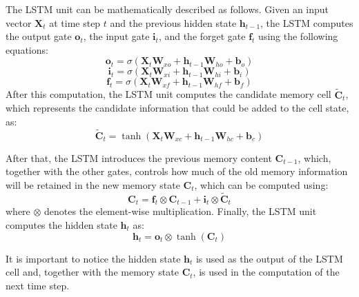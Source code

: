 The LSTM unit can be mathematically described as follows. Given an input vector $\boldsymbol{X}_t$ at time step $t$ and the previous hidden state $\boldsymbol{h}_{t-1}$, the LSTM computes the output gate $\boldsymbol{o}_t$, the input gate $\boldsymbol{i}_t$, and the forget gate $\boldsymbol{f}_t$ using the following equations:
\begin{equation}
    \boldsymbol{o}_t = \sigma\left(\boldsymbol{X}_t \boldsymbol{W}_{xo} + \boldsymbol{h}_{t-1}\boldsymbol{W}_{ho} + \boldsymbol{b}_o\right)
    \label{eq-LSTM-Ot}
\end{equation}
\begin{equation}
    \boldsymbol{i}_t = \sigma\left(\boldsymbol{X}_t \boldsymbol{W}_{xi} + \boldsymbol{h}_{t-1}\boldsymbol{W}_{hi} + \boldsymbol{b}_i\right)
    \label{eq-LSTM-It}
\end{equation}
\begin{equation}
    \boldsymbol{f}_t = \sigma\left(\boldsymbol{X}_t \boldsymbol{W}_{xf} + \boldsymbol{h}_{t-1}\boldsymbol{W}_{hf} + \boldsymbol{b}_f\right)
    \label{eq-LSTM-Ft}
\end{equation}
After this computation, the LSTM unit computes the candidate memory cell $\boldsymbol{\tilde{C}}_t$, which represents the candidate information that could be added to the cell state, as:
\begin{equation}
    \boldsymbol{\tilde{C}}_t = \tanh \left(\boldsymbol{X}_t \boldsymbol{W}_{xc} + \boldsymbol{h}_{t-1}\boldsymbol{W}_{hc} + \boldsymbol{b}_c\right)
    \label{eq-CNN-Candidate}
\end{equation}

After that, the LSTM introduces the previous memory content $\boldsymbol{C}_{t-1}$, which, together with the other gates, controls how much of the old memory information will be retained in the new memory state $\boldsymbol{C}_{t}$, which can be computed using: 
\begin{equation}
    \boldsymbol{C}_t = \boldsymbol{f}_t \otimes \boldsymbol{C}_{t-1} + \boldsymbol{i}_t \otimes \boldsymbol{\tilde{C}}_t
\end{equation}
where $\otimes$ denotes the element-wise multiplication. Finally, the LSTM unit computes the hidden state $\boldsymbol{h}_t$ as:
\begin{equation}
    \boldsymbol{h}_t = \boldsymbol{o}_t \otimes \tanh (\boldsymbol{C}_t)
\end{equation}

It is important to notice the hidden state $\boldsymbol{h}_t$ is used as the output of the LSTM cell and, together with the memory state $\boldsymbol{C}_t$, is used in the computation of the next time step.


